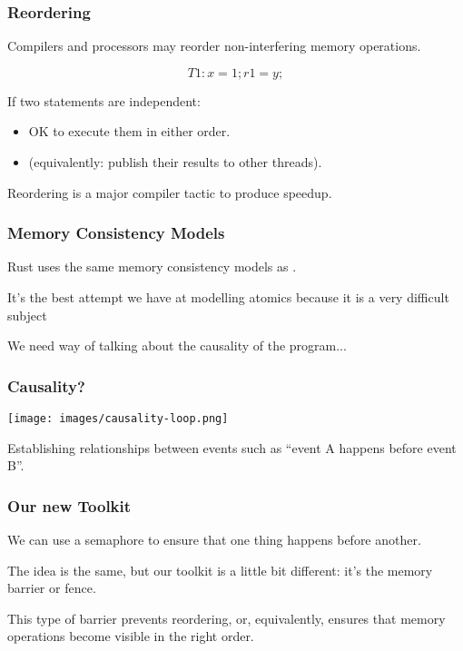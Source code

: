\begin{frame}
  \frametitle{Reordering}

  
     Compilers and processors may reorder non-interfering memory
     operations.

      \[ T1: x = 1; r1 = y; \]

     If two statements are independent:
     \begin{itemize}
        \item OK to execute them in either order.
        \item (equivalently: publish their results to other threads).
     \end{itemize}

     Reordering is a major compiler tactic to produce speedup.
  
\end{frame}


\begin{frame}
  \frametitle{Memory Consistency Models}

Rust uses the same memory consistency models as \CPP.

It's the best attempt we have at modelling atomics because it is a very difficult subject

We need way of talking about the \alert{causality} of the program...


\end{frame}

\begin{frame}
\frametitle{Causality?}

\begin{center}
	\texttt{[image: images/causality-loop.png]}
\end{center}



Establishing relationships between events such as ``event A happens before event B''. 
  
\end{frame}


\begin{frame}
\frametitle{Our new Toolkit}

We can use a semaphore to ensure that one thing happens before another. 

The idea is the same, but our toolkit is a little bit different: it's the \alert{memory barrier} or
\alert{fence}. 

This type of barrier prevents reordering, or,
equivalently, ensures that memory operations become visible in the
right order.

\end{frame}




